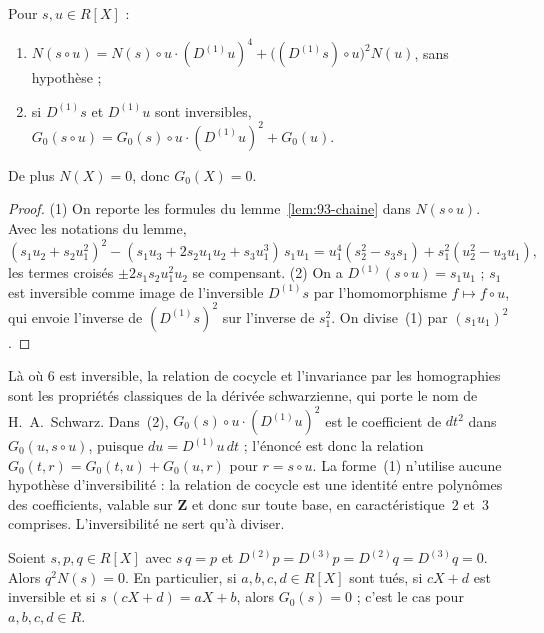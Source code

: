 \begin{enonce}
Pour $s, u \in R[X]$ :
\begin{enumerate}
\item $N(s \circ u) = N(s) \circ u \cdot (D^{(1)} u)^4 + \bigl((D^{(1)} s) \circ u\bigr)^2 N(u)$, sans hypothèse ;
\item si $D^{(1)} s$ et $D^{(1)} u$ sont inversibles, $G_0(s \circ u) = G_0(s) \circ u \cdot (D^{(1)} u)^2 + G_0(u)$.
\end{enumerate}
De plus $N(X) = 0$, donc $G_0(X) = 0$.
\end{enonce}

\begin{proof}
(1) On reporte les formules du lemme~\ref{lem:93-chaine} dans $N(s \circ u)$. Avec les notations du lemme,
\[
(s_1 u_2 + s_2 u_1^2)^2 - (s_1 u_3 + 2 s_2 u_1 u_2 + s_3 u_1^3)\, s_1 u_1 = u_1^4 (s_2^2 - s_3 s_1) + s_1^2 (u_2^2 - u_3 u_1),
\]
les termes croisés $\pm 2 s_1 s_2 u_1^2 u_2$ se compensant. (2) On a $D^{(1)}(s \circ u) = s_1 u_1$ ; $s_1$ est inversible comme image de l'inversible $D^{(1)} s$ par l'homomorphisme $f \mapsto f \circ u$, qui envoie l'inverse de $(D^{(1)} s)^2$ sur l'inverse de $s_1^2$. On divise~(1) par $(s_1 u_1)^2$.
\end{proof}

\begin{remarque}
Là où $6$ est inversible, la relation de cocycle et l'invariance par les homographies sont les propriétés classiques de la dérivée schwarzienne, qui porte le nom de H.~A.~Schwarz. Dans~(2), $G_0(s) \circ u \cdot (D^{(1)} u)^2$ est le coefficient de $dt^2$ dans $G_0(u, s \circ u)$, puisque $du = D^{(1)}u\,dt$ ; l'énoncé est donc la relation $G_0(t, r) = G_0(t, u) + G_0(u, r)$ pour $r = s \circ u$. La forme~(1) n'utilise aucune hypothèse d'inversibilité : la relation de cocycle est une identité entre polynômes des coefficients, valable sur $\mathbf Z$ et donc sur toute base, en caractéristique~$2$ et~$3$ comprises. L'inversibilité ne sert qu'à diviser.
\end{remarque}

\begin{enonce}
Soient $s, p, q \in R[X]$ avec $s\,q = p$ et $D^{(2)} p = D^{(3)} p = D^{(2)} q = D^{(3)} q = 0$. Alors $q^2 N(s) = 0$. En particulier, si $a, b, c, d \in R[X]$ sont tués, si $cX + d$ est inversible et si $s\,(cX + d) = aX + b$, alors $G_0(s) = 0$ ; c'est le cas pour $a, b, c, d \in R$.
\end{enonce}

